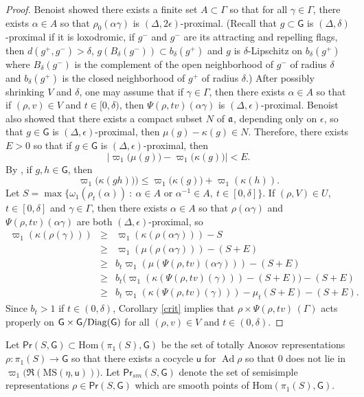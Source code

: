 \documentclass{amsart}
\theoremstyle{plain}
\theoremstyle{definition}
\theoremstyle{remark}
\newcommand{\Ad}{\operatorname{Ad}}
\renewcommand{\P}{{\sf{Pr}}}
\renewcommand{\sf}[1]{{\mathsf{#1}}}
\newcommand{\<}{\left <}
\renewcommand{\>}{\right >}
\newcommand{\G}{\Gamma}
\newcommand{\g}{\gamma}
\newcommand{\M}{\mathrm{MS}}
\newcommand{\co}{\sf u}
\begin{document}
\begin{proof}
Benoist \cite[\S 4.5]{benoist-asymptotic} showed there exists a finite set $A\subset\Gamma$ so that for all $\gamma\in\Gamma$,
there exists $\alpha\in A$ so that $\rho_0(\alpha\gamma)$ is $(\Delta,2\epsilon)$-proximal. 
(Recall that $g\subset \sf G$ is $(\Delta,\delta)$-proximal if it is loxodromic, if $g^-$ and $g^-$ are its attracting and repelling flags, then $d(g^+,g^-)>\delta$, 
$g(B_\delta(g^-))\subset b_\delta(g^+)$ and $g$ is $\delta$-Lipschitz on $b_\delta(g^+)$ where $B_\delta(g^-)$ is the complement of the open
neighborhood of $g^-$ of radius $\delta$ and $b_\delta(g^+)$ is the closed neighborhood of $g^+$ of radius $\delta$.)
After possibly shrinking $V$ and $\delta$, one may assume that if $\g\in\G$, then
there exists $\alpha\in A$ so that if $(\rho,v)\in V$ and $t\in [0,\delta)$, then
$\Psi(\rho,tv)(\alpha\gamma)$ is $(\Delta,\epsilon)$-proximal. Benoist \cite[\S 4.5]{benoist-asymptotic}
also showed that  there exists a compact subset $N$ of $\frak a$, depending only on $\epsilon$, so that
$g\in \sf G$ is $(\Delta,\epsilon)$-proximal, then 
$\mu(g)-\kappa(g)\in N$.
Therefore, there exists $E>0$ so that if $g\in \sf G$ is $(\Delta,\epsilon)$-proximal, then 
$$\Big|\varpi_1\big(\mu(g)\big)-\varpi_1\big(\kappa(g)\big)\Big|<E.$$
By \cite[Cor. 6.34]{BQ-book}, if $g,h\in\sf G$, then
$$\varpi_1\big(\kappa(gh))\big)\le\varpi_1\big(\kappa(g)\big)+\varpi_1(\kappa(h)).$$
Let $S=\max\{\omega_1(\rho_t(\alpha))\ :\ \alpha\in A\mbox{ or } \alpha^{-1}\in A,\ t\in [0,\delta]\}$. 
If $(\rho,V)\in U$, $t\in[0,\delta]$
and $\gamma\in \Gamma$, then there exists $\alpha\in A$ so that $\rho(\alpha\gamma)$ and $\Psi(\rho,tv)(\alpha\gamma)$ are both
$(\Delta,\epsilon)$-proximal, so
\begin{eqnarray*}
\varpi_1(\kappa(\rho(\g))) & \ge & \varpi_1(\kappa(\rho(\alpha\g)))-S\\ 
&\ge &\varpi_1(\mu(\rho(\alpha\g)))-(S+E)\\
&\geq & b_t\varpi_1(\mu(\Psi(\rho,tv)(\alpha\g)))-(S+E)\\
&\geq & b_t\Big(\varpi_1(\kappa(\Psi(\rho,tv)(\g)))-(S+E)\Big)-(S+E)\\
&\geq &b_t\varpi_1(\kappa(\Psi(\rho,tv)(\g)))-\mu_t(S+E)-(S+E).
\end{eqnarray*}
Since $b_t>1$ if $t\in (0,\delta)$, 
Corollary \ref{crit} implies that $\rho\times\Psi(\rho,tv)\,(\G)$ acts properly on $\sf G\times\sf G/\rm{Diag}(\sf G)$  for all
$(\rho,v)\in V$ and  $t\in(0,\delta).$
\end{proof}


Let ${\P}(S,\sf G)\subset\mathrm{Hom}(\pi_1(S),\sf G)$ be the set of totally Anosov representations $\rho:\pi_1(S)\to\mathsf G$ so
that there exists a cocycle $\co$ for $\Ad\rho$ so that $0$ does not lie in $\varpi_1\big(\Re(\M(\eta,\co))\big).$
Let  ${\P}_{sm}(S,\sf G)$ denote the set of semisimple representations $\rho\in{\P}(S,\sf G)$ which are smooth points of $\mathrm{Hom}(\pi_1(S),\sf G)$.
\end{document}
